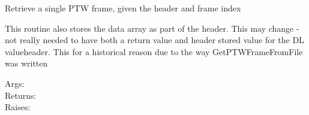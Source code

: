 \documentclass[a4paper,10pt,english]{sphinxmanual}
\begin{document}

\begin{fulllineitems}
\label{ryptw:pyradi.ryptw.getPTWFrame}
Retrieve a single PTW frame, given the header and frame index

This routine also stores the data array as part of the header. This may
change - not really needed to have both a return value and header stored
value for the DL valueheader. This for a historical reason due to the way
GetPTWFrameFromFile was written
\begin{description}
\item[{Args:}] \leavevmode
{}

\item[{Returns:}] \leavevmode
{}

\item[{Raises:}] \leavevmode
{}

\end{description}

\end{fulllineitems}

\end{document}

